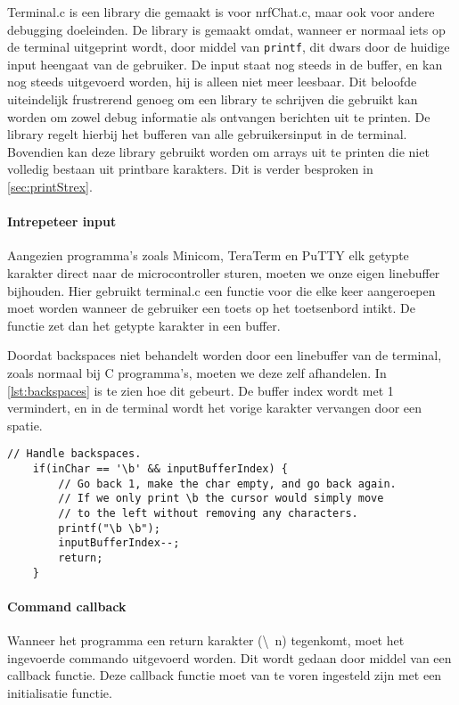 
Terminal.c is een library die gemaakt is voor nrfChat.c, maar ook voor andere debugging doeleinden. De library is gemaakt omdat, wanneer er normaal iets op de terminal uitgeprint wordt, door middel van \texttt{printf}, dit dwars door de huidige input heengaat van de gebruiker. De input staat nog steeds in de buffer, en kan nog steeds uitgevoerd worden, hij is alleen niet meer leesbaar. Dit beloofde uiteindelijk frustrerend genoeg om een library te schrijven die gebruikt kan worden om zowel debug informatie als ontvangen berichten uit te printen. De library regelt hierbij het bufferen van alle gebruikersinput in de terminal. Bovendien kan deze library gebruikt worden om arrays uit te printen die niet volledig bestaan uit printbare karakters. Dit is verder besproken in \autoref{sec:printStrex}.

\paragraph{Intrepeteer input}
Aangezien programma's zoals Minicom, TeraTerm en PuTTY elk getypte karakter direct naar de microcontroller sturen, moeten we onze eigen linebuffer bijhouden. Hier gebruikt terminal.c een functie voor die elke keer aangeroepen moet worden wanneer de gebruiker een toets op het toetsenbord intikt. De functie zet dan het getypte karakter in een buffer. 

Doordat backspaces niet behandelt worden door een linebuffer van de terminal, zoals normaal bij C programma's, moeten we deze zelf afhandelen. In \autoref{lst:backspaces} is te zien hoe dit gebeurt. De buffer index wordt met 1 vermindert, en in de terminal wordt het vorige karakter vervangen door een spatie.



\begin{lstlisting}[caption={Backspaces afhandelen},captionpos=b,label={lst:backspaces},style=c,xleftmargin=.\textwidth,xrightmargin=.\textwidth]
    // Handle backspaces.
    if(inChar == '\b' && inputBufferIndex) {
        // Go back 1, make the char empty, and go back again.
        // If we only print \b the cursor would simply move
        // to the left without removing any characters.
        printf("\b \b");
        inputBufferIndex--;
        return;
    }
\end{lstlisting}

\paragraph{Command callback}
Wanneer het programma een return karakter (\textbackslash~n) tegenkomt, moet het ingevoerde commando uitgevoerd worden. Dit wordt gedaan door middel van een callback functie. Deze callback functie moet van te voren ingesteld zijn met een initialisatie functie.

